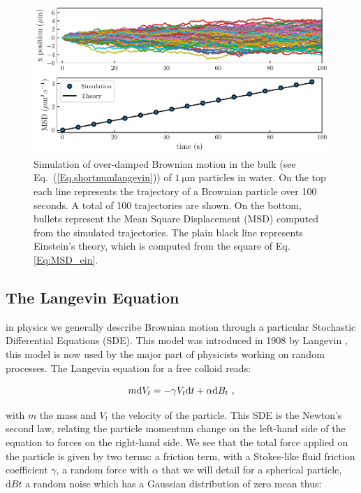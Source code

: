 \begin{figure}[!h]
	\centering
	\includegraphics{02_body/chapter1/image/brown_exemple.pdf}
	\caption{Simulation of over-damped Brownian motion in the bulk (see Eq.~(\ref{Eq.shortnumlangevin})) of $1 ~ \mathrm{\mu m}$ particles in water. On the top each line represents the trajectory of a Brownian particle over 100 seconds. A total of 100 trajectories are shown. On the bottom, bullets represent the Mean Square Displacement (\gls{MSD}) computed from the simulated trajectories. The plain black line represents Einstein's theory, which is computed from the square of Eq.\ref{Eq:MSD_ein}.\href{https://github.com/eXpensia/Ma-these/blob/main/02_body/chapter1/image/Simple_theory.ipynb}{\faGithub}}
	\label{fig:bulkbrown}
\end{figure}

\subsection{The Langevin Equation}

in physics we generally describe Brownian motion through a particular Stochastic Differential Equations (\gls{SDE}). This model was introduced in 1908 by Langevin \cite{langevin_sur_1908}, this model is now used by the major part of physicists working on random processes. The Langevin equation for a free colloid reads:

\begin{equation}
	m \textnormal{d}V_t  = - \gamma V_t \textnormal{d}t + \alpha \textnormal{d}B_t ~,
	\label{Eq.langevinEquation}
\end{equation}


with $m$ the mass and $V_t$ the velocity of the particle. This \gls{SDE} is the Newton's second law, relating the particle momentum change on the left-hand side of the equation to forces on the right-hand side. We see that the total force applied on the particle is given by two terms: a friction term, with a Stokes-like fluid friction coefficient $\gamma$, a random force with $\alpha$ that we will detail for a spherical particle, $\mathrm{d}Bt$ a random noise which has a Gaussian distribution of zero mean thus:

